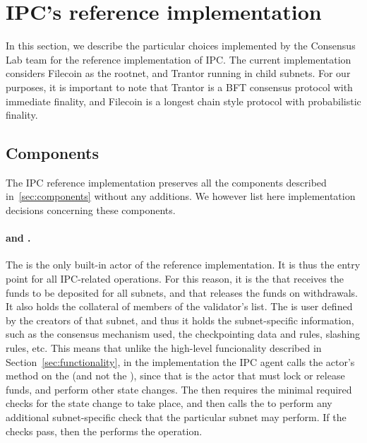  \section{IPC's reference implementation}
 \label{sec:ref-impl}
 
 In this section, we describe the particular choices implemented by the Consensus Lab team for the reference implementation of IPC.  
 The current implementation considers Filecoin as the rootnet, and Trantor running in child subnets. For our purposes, it is important to note that Trantor is a BFT consensus protocol with immediate finality, and Filecoin is a longest chain style protocol with probabilistic finality. 

\subsection{Components}
The IPC reference implementation preserves all the components described in~\cref{sec:components} without any additions. We however list here implementation decisions concerning these components.

\paragraph{\gw and \sa.} The \gw is the only built-in actor of the reference implementation. It is thus the entry point for all IPC-related operations. For this reason, it is the \gw that receives the funds to be deposited for all subnets, and that releases the funds on withdrawals. It also holds the collateral of members of the validator's list. The \sa is user defined by the creators of that subnet, and thus it holds the subnet-specific information, such as the consensus mechanism used, the checkpointing data and rules, slashing rules, etc. This means that unlike the high-level funcionality described in Section~\ref{sec:functionality}, in the implementation the IPC agent calls the actor's method on the \gw (and not the \sa), since that is the actor that must lock or release funds, and perform other state changes. The \gw then requires the minimal required checks for the state change to take place, and then calls the \sa to perform any additional subnet-specific check that the particular subnet may perform. If the checks pass, then the \gw performs the operation.   

